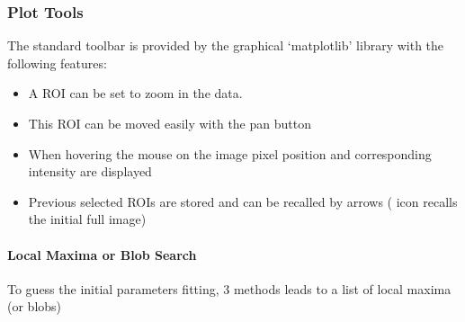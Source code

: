 \documentclass[letterpaper,10pt,english]{sphinxmanual}
\begin{document}
\subsubsection{Plot Tools}
\label{\detokenize{PeakSearchGUI:plot-tools}}
The standard toolbar is provided by the graphical ‘matplotlib’ library with the following features:
\begin{itemize}
\item {} 
A ROI can be set to zoom in the data.
\begin{quote}

\noindent{}
\end{quote}

\item {} 
This ROI can be moved easily with the pan button
\begin{quote}

\noindent{}
\end{quote}

\item {} 
When hovering the mouse on the image pixel position and corresponding intensity are displayed
\begin{quote}

\noindent{}
\end{quote}

\item {} 
Previous selected ROIs are stored and can be recalled by arrows ( icon recalls the initial full image)

\end{itemize}


\paragraph{Local Maxima or Blob Search}
\label{\detokenize{PeakSearchGUI:local-maxima-or-blob-search}}
To guess the initial parameters fitting, 3 methods leads to a list of local maxima (or blobs)

\noindent{}
\end{document}
